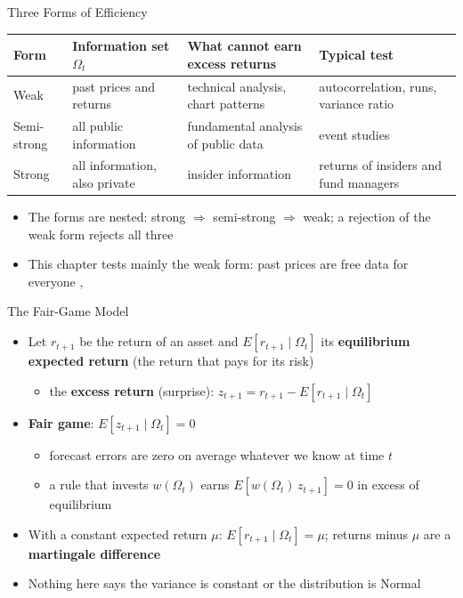 \begin{frame}{Three Forms of Efficiency}
\itemsize{\small}
\begin{center}
\footnotesize
\begin{tabular}{>{\raggedright\arraybackslash}p{1.8cm}>{\raggedright\arraybackslash}p{3.2cm}>{\raggedright\arraybackslash}p{3.0cm}>{\raggedright\arraybackslash}p{2.9cm}}
\toprule
\textbf{Form} & \textbf{Information set $\Omega_t$} & \textbf{What cannot earn excess returns} & \textbf{Typical test} \\
\midrule
Weak & past prices and returns & technical analysis, chart patterns & autocorrelation, runs, variance ratio \\
Semi-strong & all public information & fundamental analysis of public data & event studies \\
Strong & all information, also private & insider information & returns of insiders and fund managers \\
\bottomrule
\end{tabular}
\end{center}
\begin{itemize}
    \item The forms are nested: strong $\Rightarrow$ semi-strong $\Rightarrow$ weak; a rejection of the weak form rejects all three
    \item This chapter tests mainly the weak form: past prices are free data for everyone , 
\end{itemize}
\end{frame}

\begin{frame}{The Fair-Game Model}
\itemsize{\small}
\begin{itemize}
    \item Let $r_{t+1}$ be the return of an asset and $E[r_{t+1} \mid \Omega_t]$ its \textbf{equilibrium expected return} (the return that pays for its risk)
    \begin{itemize}
        \item the \textbf{excess return} (surprise): $z_{t+1} = r_{t+1} - E[r_{t+1} \mid \Omega_t]$
    \end{itemize}
    \item \textbf{Fair game}: $E[z_{t+1} \mid \Omega_t] = 0$
    \begin{itemize}
        \item forecast errors are zero on average whatever we know at time $t$
        \item a rule that invests $w(\Omega_t)$ earns $E[w(\Omega_t)\, z_{t+1}] = 0$ in excess of equilibrium
    \end{itemize}
    \item With a constant expected return $\mu$: $E[r_{t+1} \mid \Omega_t] = \mu$; returns minus $\mu$ are a \textbf{martingale difference}
    \item Nothing here says the variance is constant or the distribution is Normal
\end{itemize}
\end{frame}

